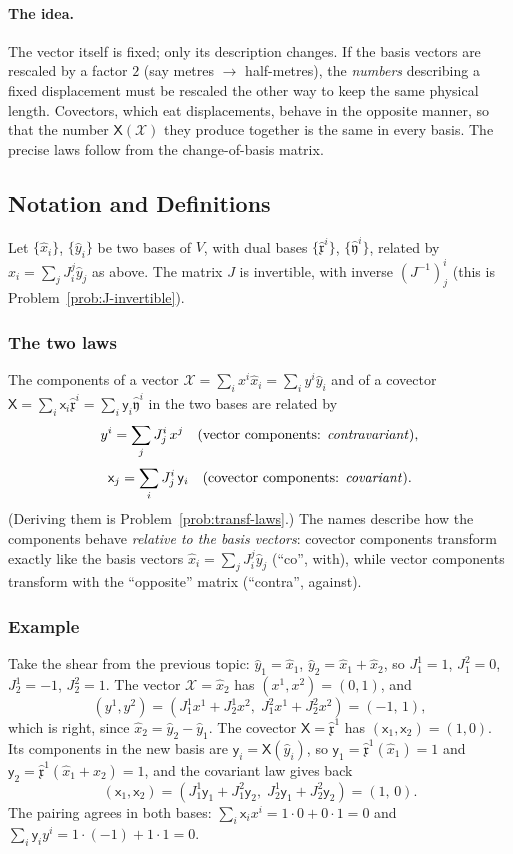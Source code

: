 \documentclass[11pt]{article}
\begin{document}
\paragraph{The idea.}
The vector itself is fixed; only its description changes. If the basis vectors are rescaled by a factor $2$ (say metres $\to$ half-metres), the \emph{numbers} describing a fixed displacement must be rescaled the other way to keep the same physical length. Covectors, which eat displacements, behave in the opposite manner, so that the number $\mathsf X(\mathcal X)$ they produce together is the same in every basis. The precise laws follow from the change-of-basis matrix.

\subsection*{Notation and Definitions}

Let $\{\hat x_i\}$, $\{\hat y_i\}$ be two bases of $V$, with dual bases $\{\hat{\mathfrak x}^i\}$, $\{\hat{\mathfrak y}^i\}$, related by $\hat x_i=\sum_j J_i^j\hat y_j$ as above. The matrix $J$ is invertible, with inverse $(J^{-1})^i_j$ (this is Problem~\ref{prob:J-invertible}).

\subsubsection*{The two laws}
The components of a vector $\mathcal X=\sum_ix^i\hat x_i=\sum_iy^i\hat y_i$ and of a covector $\mathsf X=\sum_i\mathsf x_i\hat{\mathfrak x}^i=\sum_i\mathsf y_i\hat{\mathfrak y}^i$ in the two bases are related by
\[
y^i=\sum_j J_j^i\, x^j \quad (\text{vector components: \emph{contravariant}}),
\]
\[
\mathsf x_j=\sum_i J_j^i\, \mathsf y_i \quad (\text{covector components: \emph{covariant}}).
\]
(Deriving them is Problem~\ref{prob:transf-laws}.) The names describe how the components behave \emph{relative to the basis vectors}: covector components transform exactly like the basis vectors $\hat x_i=\sum_jJ_i^j\hat y_j$ (``co'', with), while vector components transform with the ``opposite'' matrix (``contra'', against).

\subsubsection*{Example}
Take the shear from the previous topic: $\hat y_1=\hat x_1$, $\hat y_2=\hat x_1+\hat x_2$, so $J^1_1=1$, $J^2_1=0$, $J^1_2=-1$, $J^2_2=1$. The vector $\mathcal X=\hat x_2$ has $(x^1,x^2)=(0,1)$, and
\[
(y^1,y^2)=(J^1_1x^1+J^1_2x^2,\;J^2_1x^1+J^2_2x^2)=(-1,\,1),
\]
which is right, since $\hat x_2=\hat y_2-\hat y_1$. The covector $\mathsf X=\hat{\mathfrak x}^1$ has $(\mathsf x_1,\mathsf x_2)=(1,0)$. Its components in the new basis are $\mathsf y_i=\mathsf X(\hat y_i)$, so $\mathsf y_1=\hat{\mathfrak x}^1(\hat x_1)=1$ and $\mathsf y_2=\hat{\mathfrak x}^1(\hat x_1+\hat x_2)=1$, and the covariant law gives back
\[
(\mathsf x_1,\mathsf x_2)=(J^1_1\mathsf y_1+J^2_1\mathsf y_2,\;J^1_2\mathsf y_1+J^2_2\mathsf y_2)=(1,\,0).
\]
The pairing agrees in both bases: $\sum_i\mathsf x_ix^i=1\cdot0+0\cdot1=0$ and $\sum_i\mathsf y_iy^i=1\cdot(-1)+1\cdot1=0$.
\end{document}
